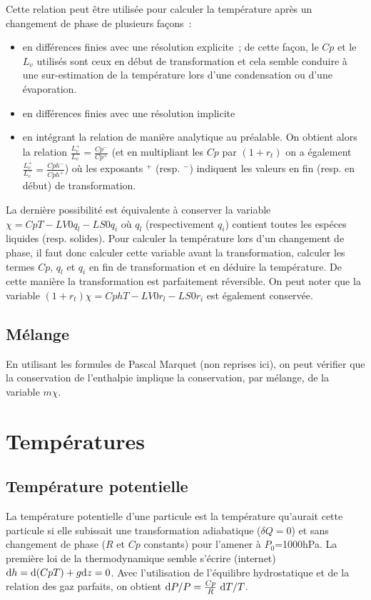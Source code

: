 \documentclass{article}
\begin{document}
Cette relation peut être utilisée pour calculer la température après un changement de phase de plusieurs façons~:
\begin{itemize}
  \item en différences finies avec une résolution explicite~; de cette façon, le $Cp$ et le $L_v$ utilisés sont ceux en début de transformation et cela semble conduire à une sur-estimation de la température lors d'une condensation ou d'une évaporation.
  \item en différences finies avec une résolution implicite
  \item en intégrant la relation de manière analytique au préalable. On obtient alors la relation $\frac{L_v^+}{L_v^-}=\frac{Cp^-}{Cp^+}$ (et en multipliant les $Cp$ par $(1+r_t)$ on a également $\frac{L_v^+}{L_v^-}=\frac{Cph^-}{Cph^+}$) où les exposants $^+$ (resp. $^-$) indiquent les valeurs en fin (resp. en début) de transformation.
\end{itemize}

La dernière possibilité est équivalente à conserver la variable $\chi=CpT-LV0 q_l-LS0 q_i$ où $q_l$ (respectivement $q_i$) contient toutes les espéces liquides (resp. solides). Pour calculer la température lors d'un changement de phase, il faut donc calculer cette variable avant la transformation, calculer les termes $Cp$, $q_l$ et $q_i$ en fin de transformation et en déduire la température. De cette manière la transformation est parfaitement réversible. On peut noter que la variable $(1+r_t)\chi=CphT-LV0 r_l-LS0 r_i$ est également conservée.

\subsection{Mélange}
En utilisant les formules de Pascal Marquet (non reprises ici), on peut vérifier que la conservation de l'enthalpie implique la conservation, par mélange, de la variable $m\chi$.

\section{Températures}
\label{temperatures}

\subsection{Température potentielle}
\label{theta}
La température potentielle d'une particule est la température qu'aurait cette particule si elle subissait une transformation adiabatique ($\delta Q=0$) et sans changement de phase ($R$ et $Cp$ constants) pour l'amener à $P_0$=1000hPa.
La première loi de la thermodynamique semble s'écrire (internet) ${\rm d}h={\rm d}(CpT)+g{\rm d}z=0$. Avec l'utilisation de l'équilibre hydrostatique et de la relation des gaz parfaits, on obtient ${\rm d}P/P=\frac{Cp}{R}{\ \rm d}T/T$.
\end{document}
